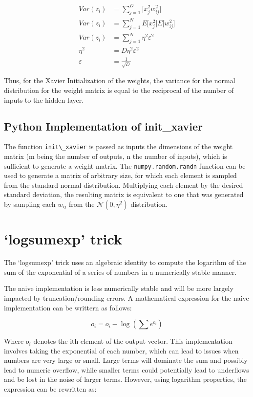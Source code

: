 \documentclass{article}
\begin{document}
\begin{align}
Var(z_i) &= \sum_{j=1}^{D} \Big[x_{j}^2 w_{ij}^2\Big] \\
Var(z_i) & = \sum_{j=1}^{N} E\Big[x_{j}^2\Big] E\Big[w_{ij}^2\Big] \\
Var(z_i) &= \sum_{j=1}^{N} \eta^2 \varepsilon^2 \\
\eta^2 &= D\eta^2 \varepsilon^2 \\
\varepsilon &= \frac{1}{\sqrt{D}}
\end{align}

Thus, for the Xavier Initialization of the weights, the variance for the normal distribution for the weight matrix is equal to the reciprocal of the number of inputs to the hidden layer.

\subsection{Python Implementation of init\_xavier}
The function \verb+init\_xavier+ is passed as inputs the dimensions of the weight matrix (m being the number of outputs, n the number of inputs), which is sufficient to generate a weight matrix. The \verb+numpy.random.randn+ function can be used to generate a matrix of arbitrary size, for which each element is sampled from the standard normal distribution. Multiplying each element by the desired standard deviation, the resulting matrix is equivalent to one that was generated by sampling each $w_{ij}$ from the $\mathcal{N}(0,\eta^2)$ distribution.


\section{`logsumexp' trick}
The `logsumexp' trick uses an algebraic identity to compute the logarithm of the sum of the exponential of a series of numbers in a numerically stable manner.

The naive implementation is less numerically stable and will be more largely impacted by truncation/rounding errors. A mathematical expression for the naive implementation can be writtern as follows:

\begin{equation}
o_i = o_i - \log(\sum e^{o_i})
\end{equation}

Where $o_i$ denotes the ith element of the output vector. This implementation involves taking the exponential of each number, which can lead to issues when numbers are very large or small. Large terms will dominate the sum and possibly lead to numeric overflow, while smaller terms could potentially lead to underflows and be lost in the noise of larger terms. However, using logarithm properties, the expression can be rewritten as:
\end{document}
